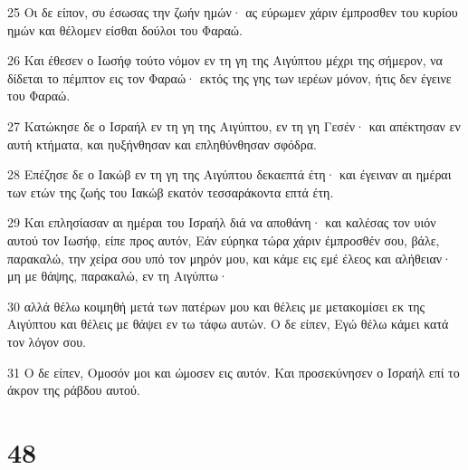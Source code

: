 \par 25 Οι δε είπον, συ έσωσας την ζωήν ημών· ας εύρωμεν χάριν έμπροσθεν του κυρίου ημών και θέλομεν είσθαι δούλοι του Φαραώ.
\par 26 Και έθεσεν ο Ιωσήφ τούτο νόμον εν τη γη της Αιγύπτου μέχρι της σήμερον, να δίδεται το πέμπτον εις τον Φαραώ· εκτός της γης των ιερέων μόνον, ήτις δεν έγεινε του Φαραώ.
\par 27 Κατώκησε δε ο Ισραήλ εν τη γη της Αιγύπτου, εν τη γη Γεσέν· και απέκτησαν εν αυτή κτήματα, και ηυξήνθησαν και επληθύνθησαν σφόδρα.
\par 28 Επέζησε δε ο Ιακώβ εν τη γη της Αιγύπτου δεκαεπτά έτη· και έγειναν αι ημέραι των ετών της ζωής του Ιακώβ εκατόν τεσσαράκοντα επτά έτη.
\par 29 Και επλησίασαν αι ημέραι του Ισραήλ διά να αποθάνη· και καλέσας τον υιόν αυτού τον Ιωσήφ, είπε προς αυτόν, Εάν εύρηκα τώρα χάριν έμπροσθέν σου, βάλε, παρακαλώ, την χείρα σου υπό τον μηρόν μου, και κάμε εις εμέ έλεος και αλήθειαν· μη με θάψης, παρακαλώ, εν τη Αιγύπτω·
\par 30 αλλά θέλω κοιμηθή μετά των πατέρων μου και θέλεις με μετακομίσει εκ της Αιγύπτου και θέλεις με θάψει εν τω τάφω αυτών. Ο δε είπεν, Εγώ θέλω κάμει κατά τον λόγον σου.
\par 31 Ο δε είπεν, Ομοσόν μοι και ώμοσεν εις αυτόν. Και προσεκύνησεν ο Ισραήλ επί το άκρον της ράβδου αυτού.

\chapter{48}

